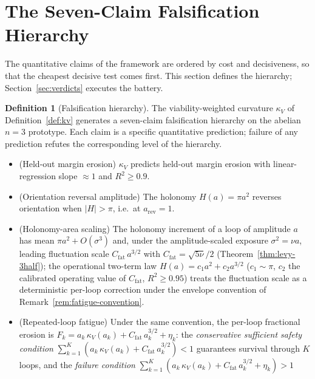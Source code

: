 \documentclass[11pt,a4paper]{article}
\theoremstyle{plain}
\theoremstyle{definition}
\newtheorem{definition}[theorem]{Definition}
\theoremstyle{remark}
\newcommand{\kk}{\kappa_{\!V}}
\begin{document}

\section{The Seven-Claim Falsification Hierarchy}\label{sec:hierarchy}

The quantitative claims of the framework are ordered by cost and
decisiveness, so that the cheapest decisive test comes first. This
section defines the hierarchy; Section~\ref{sec:verdicts} executes the
battery.

\begin{definition}[Falsification hierarchy]
\label{def:hierarchy}
The viability-weighted curvature $\kk$ of
Definition~\ref{def:kv} generates
a seven-claim falsification
hierarchy on the abelian $n=3$ prototype. Each claim is a
specific quantitative prediction; failure of any prediction refutes
the corresponding level of the hierarchy.
\begin{itemize}[leftmargin=1.2em,itemsep=2pt]
\item[\textbf{A.}] (Held-out margin erosion) $\kk$ predicts held-out
margin erosion with linear-regression slope $\approx 1$ and $R^2\geq 0.9$.
\item[\textbf{B.}] (Orientation reversal amplitude) The holonomy
$H(a)=\pi a^2$ reverses orientation when $|H|>\pi$, i.e.\ at
$a_{\mathrm{rev}}=1$.
\item[\textbf{C.}] (Holonomy-area scaling) The holonomy increment
of a loop of amplitude $a$ has mean $\pi a^{2}+O(\sigma^{3})$ and,
under the amplitude-scaled exposure $\sigma^{2}=\nu a$, leading
fluctuation scale $C_{\mathrm{fat}}\,a^{3/2}$ with
$C_{\mathrm{fat}}=\sqrt{5\nu}/2$
(Theorem~\ref{thm:levy-3half}); the operational two-term law
$H(a)=c_1a^{2}+c_2a^{3/2}$ ($c_1\sim\pi$, $c_2$ the calibrated
operating value of $C_{\mathrm{fat}}$, $R^{2}\geq 0.95$) treats the
fluctuation scale as a deterministic per-loop correction under the
envelope convention of Remark~\ref{rem:fatigue-convention}.
\item[\textbf{D.}] (Repeated-loop fatigue) Under the same
convention, the per-loop fractional erosion is
$F_k = a_k\,\kk(a_k) + C_{\mathrm{fat}}\,a_k^{3/2} + \eta_k$:
the \emph{conservative sufficient safety condition}
$\sum_{k=1}^{K}(a_k\,\kk(a_k) + C_{\mathrm{fat}}\,a_k^{3/2}) < 1$
guarantees survival through $K$ loops, and the \emph{failure
condition}
$\sum_{k=1}^{K}(a_k\,\kk(a_k) + C_{\mathrm{fat}}\,a_k^{3/2} + \eta_k) > 1$

\end{itemize}
\end{definition}
\end{document}
